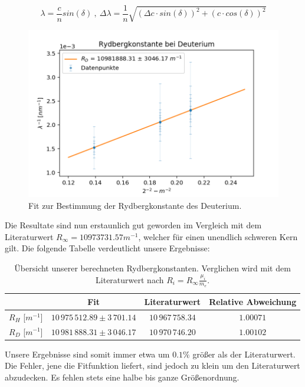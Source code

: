 \documentclass[]{article}
\begin{document}
\begin{equation}
\lambda = \frac{c}{n} sin(\delta) \:,\: \Delta\lambda = \frac{1}{n} \sqrt{(\Delta c \cdot sin(\delta))^2 + (c\cdot cos(\delta) )^2}
\end{equation}

\begin{figure}[H]
\centering
\includegraphics[width=1\textwidth]{Plots/R_D.png}
\caption{ Fit zur Bestimmung der Rydbergkonstante des Deuterium.}
\label{fig:Rydberg D}
\end{figure}

Die Resultate sind nun erstaunlich gut geworden im Vergleich mit dem Literaturwert $R_\infty = 10973731.57 m^{-1}$, welcher für einen unendlich schweren Kern gilt. Die folgende Tabelle verdeutlicht unsere Ergebnisse:

\begin{table}[H]
	\centering
	\begin{tabular}{c|c|c|c}
		  & Fit & Literaturwert & Relative Abweichung  \\
		\hline
		$R_H$ [$m^{-1}$]& $10\,975\,512.89\pm 3\,701.14$ & $10\,967\,758.34$ & $1.00071$ \\
		\hline
		$R_D$ [$m^{-1}$]& $10\,981\,888.31\pm 3\,046.17$ & $10\,970\,746.20$ & $1.00102$ \\
	\end{tabular}
	\caption{Übersicht unserer berechneten Rydbergkonstanten. Verglichen wird mit dem Literaturwert nach $R_i = R_\infty \frac{\mu_i}{m_e}$.}
\end{table}

Unsere Ergebnisse sind somit immer etwa um $0.1\%$ größer als der Literaturwert. Die Fehler, jene die Fitfunktion liefert, sind jedoch zu klein um den Literaturwert abzudecken. Es fehlen stets eine halbe bis ganze Größenordnung.
\end{document}
